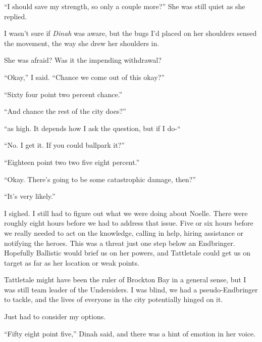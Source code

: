 ``I should save my strength, so only a couple more?''  She was still quiet as she replied.



I wasn't sure if \emph{Dinah} was aware, but the bugs I'd placed on her shoulders sensed the movement, the way she drew her shoulders in.



She was afraid?  Was it the impending withdrawal?



``Okay,'' I said.  ``Chance we come out of this okay?''



``Sixty four point two percent chance.''



``And chance the rest of the city does?''



``\ldotsNot as high.  It depends how I ask the question, but if I do-``



``No.  I get it.  If you could ballpark it?''



``Eighteen point two two five eight percent.''



``Okay.  There's going to be some catastrophic damage, then?''



``It's very likely.''



I sighed.  I still had to figure out what we were doing about Noelle.  There were roughly eight hours before we had to address that issue.  Five or six hours before we really needed to act on the knowledge, calling in help, hiring assistance or notifying the heroes.  This was a threat just one step below an Endbringer.  Hopefully Ballistic would brief us on her powers, and Tattletale could get us on target as far as her location or weak points.



Tattletale might have been the ruler of Brockton Bay in a general sense, but I was still team leader of the Undersiders.  I was blind, we had a pseudo-Endbringer to tackle, and the lives of everyone in the city potentially hinged on it.



Just had to consider my options.



``Fifty eight point five,'' Dinah said, and there was a hint of emotion in her voice.




